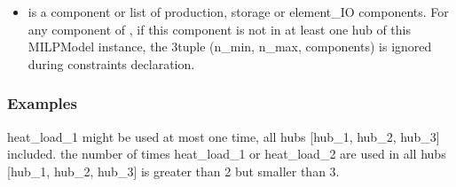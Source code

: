 \documentclass[letterpaper,10pt,english]{sphinxmanual}
\begin{document}
\begin{fulllineitems}
\begin{fulllineitems}
\begin{itemize}
\item {} 
\sphinxAtStartPar
{} is a component or list of production, storage or element\_IO components.
For any component of , if this component is not in at least one hub of this MILPModel instance,
the 3\sphinxhyphen{}tuple (n\_min, n\_max, components) is ignored during constraints declaration.

\end{itemize}
\subsubsection*{Examples}

\begin{sphinxVerbatim}[commandchars=\\\{\}]
  \PYG{p}{[} \PYG{p}{]}
  \PYG{p}{[}\PYG{p}{]}
  \PYG{p}{[}\PYG{p}{]}
  \PYG{p}{[}  \PYG{p}{]}
  \PYG{p}{[}     \PYG{p}{[} \PYG{p}{]}\PYG{p}{]}
\end{sphinxVerbatim}

\sphinxAtStartPar
heat\_load\_1 might be used at most one time, all hubs {[}hub\_1, hub\_2, hub\_3{]} included.
the number of times heat\_load\_1 or heat\_load\_2 are used in all hubs {[}hub\_1, hub\_2, hub\_3{]}
is greater than 2 but smaller than 3.

\end{fulllineitems}


\end{fulllineitems}
\end{document}
